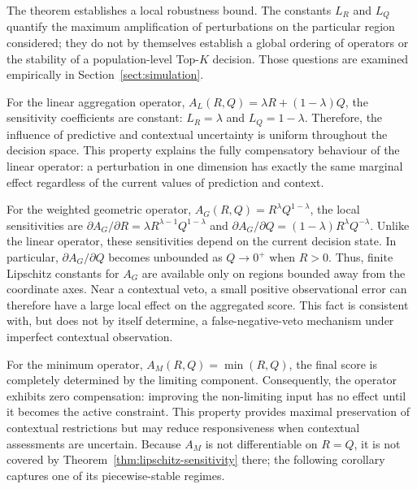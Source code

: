 \documentclass[mathematics,article,submit,moreauthors]{Definitions/mdpi}
\begin{document}
{\color{blue}The theorem establishes a local robustness bound. The
constants $L_R$ and $L_Q$ quantify the maximum amplification of
perturbations on the particular region considered; they do not by
themselves establish a global ordering of operators or the stability of a
population-level Top-$K$ decision. Those questions are examined
empirically in Section~\ref{sect:simulation}.}

For the linear aggregation operator,
$A_L(R,Q)=\lambda R+(1-\lambda)Q$,
the sensitivity coefficients are constant:
$L_R=\lambda$ and $L_Q=1-\lambda$.
Therefore, the influence of predictive and contextual uncertainty is
uniform throughout the decision space. This property explains the fully
compensatory behaviour of the linear operator: a perturbation in one
dimension has exactly the same marginal effect regardless of the
current values of prediction and context.

For the weighted geometric operator,
$A_G(R,Q)=R^\lambda Q^{1-\lambda}$,
the local sensitivities are
$\partial A_G/\partial R=\lambda R^{\lambda-1}Q^{1-\lambda}$
and
$\partial A_G/\partial Q=(1-\lambda)R^\lambda Q^{-\lambda}$.
{\color{blue}Unlike the linear operator, these sensitivities depend on the
current decision state. In particular, $\partial A_G/\partial Q$ becomes
unbounded as $Q\to0^+$ when $R>0$. Thus, finite Lipschitz constants for
$A_G$ are available only on regions bounded away from the coordinate axes.
Near a contextual veto, a small positive observational error can therefore
have a large local effect on the aggregated score. This fact is consistent
with, but does not by itself determine, a false-negative-veto mechanism under
imperfect contextual observation.}

For the minimum operator,
{\color{teal}$A_M(R,Q)=\min(R,Q)$,}
the final score is completely determined by the limiting component.
Consequently, the operator exhibits zero compensation: improving the
non-limiting input has no effect until it becomes the active constraint.
This property provides maximal preservation of contextual restrictions
but may reduce responsiveness when contextual assessments are uncertain.
{\color{blue}Because $A_M$ is not differentiable on $R=Q$, it is not covered
by Theorem~\ref{thm:lipschitz-sensitivity} there; the following corollary
captures one of its piecewise-stable regimes.}
\end{document}
